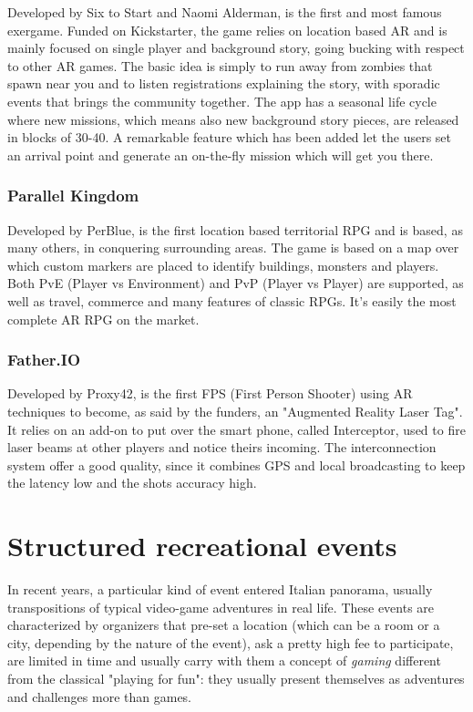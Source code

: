 				Developed by Six to Start and Naomi Alderman, is the first and most famous exergame. Funded on Kickstarter, the game relies on location based AR and is mainly focused on single player and background story, going bucking with respect to other AR games.
				The basic idea is simply to run away from zombies that spawn near you and to listen registrations explaining the story, with sporadic events that brings the community together.
				The app has a seasonal life cycle where new missions, which means also new background story pieces, are released in blocks of 30-40.
				A remarkable feature which has been added let the users set an arrival point and generate an on-the-fly mission which will get you there.
			
			\subsubsection{Parallel Kingdom}
			
				Developed by PerBlue, is the first location based territorial RPG and is based, as many others, in conquering surrounding areas.
				The game is based on a map over which custom markers are placed to identify buildings, monsters and players.
				Both PvE (Player vs Environment) and PvP (Player vs Player) are supported, as well as travel, commerce and many features of classic RPGs.
				It's easily the most complete AR RPG on the market.
			
			\subsubsection{Father.IO}
			
				Developed by Proxy42, is the first FPS (First Person Shooter) using AR techniques to become, as said by the funders, an "Augmented Reality Laser Tag".
				It relies on an add-on to put over the smart phone, called Interceptor, used to fire laser beams at other players and notice theirs incoming.
				The interconnection system offer a good quality, since it combines GPS and local broadcasting to keep the latency low and the shots accuracy high.
				
	\section{Structured recreational events}
	
		In recent years, a particular kind of event entered Italian panorama, usually transpositions of typical video-game adventures in real life.
		These events are characterized by organizers that pre-set a location (which can be a room or a city, depending by the nature of the event), ask a pretty high fee to participate, are limited in time and usually carry with them a concept of \emph{gaming} different from the classical "playing for fun": they usually present themselves as adventures and challenges more than games.
		
